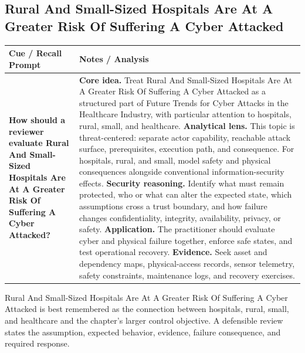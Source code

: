 \documentclass[11pt]{article}
\newcommand{\CornellHeader}{%
\rowcolor{Navy}\color{white}\bfseries Cue / Recall Prompt & \color{white}\bfseries Notes / Analysis\\\hline}
\newcommand{\CornellRow}[2]{%
\cellcolor{CueGray}\RaggedRight\textbf{#1} & \RaggedRight #2\\\hline}
\begin{document}
\subsection*{Rural And Small-Sized Hospitals Are At A Greater Risk Of Suffering A Cyber Attacked}
\begin{longtable}{>{\RaggedRight\arraybackslash}p{}|>{\RaggedRight\arraybackslash}p{}}
\CornellHeader
\CornellRow{How should a reviewer evaluate Rural And Small-Sized Hospitals Are At A Greater Risk Of Suffering A Cyber Attacked?}{\textbf{Core idea.} Treat Rural And Small-Sized Hospitals Are At A Greater Risk Of Suffering A Cyber Attacked as a structured part of Future Trends for Cyber Attacks in the Healthcare Industry, with particular attention to hospitals, rural, small, and healthcare. \textbf{Analytical lens.} This topic is threat-centered: separate actor capability, reachable attack surface, prerequisites, execution path, and consequence. For hospitals, rural, and small, model safety and physical consequences alongside conventional information-security effects. \textbf{Security reasoning.} Identify what must remain protected, who or what can alter the expected state, which assumptions cross a trust boundary, and how failure changes confidentiality, integrity, availability, privacy, or safety. \textbf{Application.} The practitioner should evaluate cyber and physical failure together, enforce safe states, and test operational recovery. \textbf{Evidence.} Seek asset and dependency maps, physical-access records, sensor telemetry, safety constraints, maintenance logs, and recovery exercises.}
\end{longtable}
\begin{topicsummary}
Rural And Small-Sized Hospitals Are At A Greater Risk Of Suffering A Cyber Attacked is best remembered as the connection between hospitals, rural, small, and healthcare and the chapter's larger control objective. A defensible review states the assumption, expected behavior, evidence, failure consequence, and required response.
\end{topicsummary}
\end{document}
